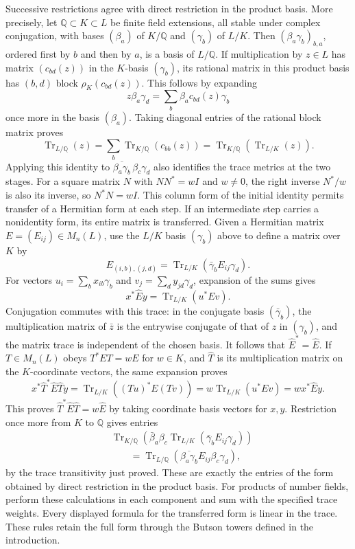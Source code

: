 \documentclass[10pt]{article}
\newcommand{\Q}{\mathbb Q}
\newcommand{\Tr}{\operatorname{Tr}}
\begin{document}
Successive restrictions agree with direct restriction in the product
basis. More precisely, let $\Q\subset K\subset L$ be finite field
extensions, all stable under complex conjugation, with bases
$(\beta_a)$ of $K/\Q$ and $(\gamma_b)$ of $L/K$.
Then $(\beta_a\gamma_b)_{b,a}$, ordered first by $b$ and then by $a$,
is a basis of $L/\Q$. If multiplication
by $z\in L$ has matrix $(c_{bd}(z))$ in the $K$-basis $(\gamma_b)$,
its rational matrix in this product basis has $(b,d)$ block
$\rho_K(c_{bd}(z))$. This follows by expanding
\[
 z\beta_a\gamma_d=\sum_b\beta_a c_{bd}(z)\gamma_b
\]
once more in the basis $(\beta_a)$.
Taking diagonal entries of the rational block matrix proves
\[
 \Tr_{L/\Q}(z)
 =\sum_b\Tr_{K/\Q}(c_{bb}(z))
 =\Tr_{K/\Q}\!\left(\Tr_{L/K}(z)\right).
\]
Applying this identity to $\overline{\beta_a\gamma_b}\,
\beta_c\gamma_d$ also identifies the trace metrics at the two stages.
For a square matrix $N$ with $NN^*=wI$ and $w\ne0$, the right inverse
$N^*/w$ is also its inverse, so $N^*N=wI$.
This column form of the initial identity permits transfer of a
Hermitian form at each step. If an intermediate step carries a
nonidentity form, its entire matrix is transferred. Given a
Hermitian matrix $E=(E_{ij})\in M_n(L)$, use the $L/K$ basis
$(\gamma_b)$ above to define a matrix over $K$ by
\[
 \widehat E_{(i,b),(j,d)}
       =\Tr_{L/K}(\bar\gamma_b E_{ij}\gamma_d).
\]
For vectors $u_i=\sum_bx_{ib}\gamma_b$ and
$v_j=\sum_dy_{jd}\gamma_d$, expansion of the sums gives
\[
 x^*\widehat E y=\Tr_{L/K}(u^*Ev).
\]
Conjugation commutes with this trace: in the conjugate basis
$(\bar\gamma_b)$, the multiplication matrix of $\bar z$ is the
entrywise conjugate of that of $z$ in $(\gamma_b)$, and the matrix
trace is independent of the chosen basis. It follows that
$\widehat E^*=\widehat E$. If $T\in M_n(L)$ obeys
$T^*ET=wE$ for $w\in K$, and $\widehat T$ is its multiplication
matrix on the $K$-coordinate vectors, the same expansion proves
\[
 x^*\widehat T^*\widehat E\widehat T y
 =\Tr_{L/K}((Tu)^*E(Tv))
 =w\Tr_{L/K}(u^*Ev)=wx^*\widehat E y.
\]
This proves $\widehat T^*\widehat E\widehat T=w\widehat E$ by
taking coordinate basis vectors for $x,y$.
Restriction once more from $K$ to $\Q$ gives entries
\begin{align*}
 &\Tr_{K/\Q}\!\left(\bar\beta_a\beta_c
       \Tr_{L/K}(\bar\gamma_b E_{ij}\gamma_d)\right)\\
 &\hspace{2em}=\Tr_{L/\Q}\!\left(
       \overline{\beta_a\gamma_b}E_{ij}\beta_c\gamma_d\right),
\end{align*}
by the trace transitivity just proved. These are exactly the entries
of the form obtained by direct restriction in the product basis.
For products of number fields, perform these calculations in each
component and sum with the specified trace weights. Every displayed
formula for the transferred form is linear in the trace. These rules
retain the full form through the Butson towers defined in the
introduction.
\end{document}
